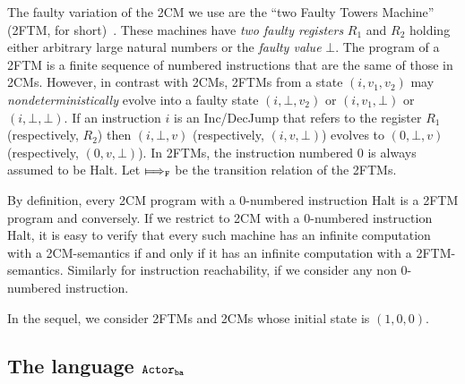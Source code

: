 \documentclass{LMCS}
\theoremstyle{plain}\newtheorem{proposition}[thm]{Proposition}
\theoremstyle{plain}\newtheorem{lemma}[thm]{Lemma}
\theoremstyle{plain}\newtheorem{theorem}[thm]{Theorem}
\theoremstyle{plain}\newtheorem{corollary}[thm]{Corollary}
\newcommand{\actba}{${\tt Actor_{\tt ba}}$}
\begin{document}
The faulty variation of the 2CM we use are the
``two Faulty Towers Machine'' (2FTM, for short)~\cite{FTM}. These machines have
\emph{two faulty registers} 
$R_1$ and $R_2$ holding either arbitrary large natural numbers or the \emph{faulty value} 
$\bot$. The program of a 2FTM is a finite sequence of numbered instructions that are 
the same of those in 2CMs. However, in contrast with 2CMs, 2FTMs from a state
$(i,v_1,v_2)$ may
\emph{nondeterministically} evolve into a faulty state $(i,\bot,v_2)$ or 
$(i,v_1,\bot)$ or
$(i,\bot,\bot)$. If an instruction $i$ is an {\sf Inc}/{\sf DecJump} that refers to
the register $R_1$ (respectively, $R_2$) then $(i,\bot,v)$ (respectively, 
$(i,v,\bot)$) evolves to $(0,\bot,v)$ (respectively, $(0,v,\bot)$).
In 2FTMs, the instruction numbered 0 is always assumed to be {\sf Halt}.
Let $\Longmapsto_{\tt F}$ be the transition relation of the  2FTMs.

By definition, every 2CM program with a 0-numbered instruction {\sf Halt} is 
a 2FTM program and conversely. If we restrict to 2CM with a 0-numbered instruction {\sf Halt},
it is easy to verify that every 
such machine has an infinite computation with a 2CM-semantics if and only if it
has an infinite computation with a 2FTM-semantics. Similarly for instruction reachability,
if we consider any non 0-numbered instruction.

In the sequel, we consider 2FTMs and 2CMs whose initial state is $(1,0,0)$.





\subsection{The language {\actba}}
\label{ssec.finiteactors}
\end{document}
